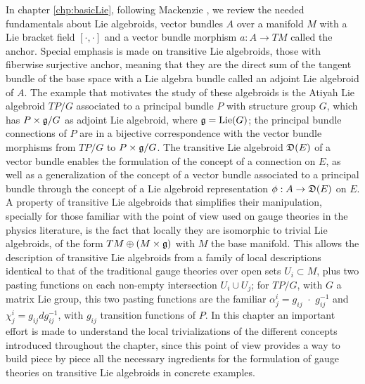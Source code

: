 In chapter \ref{chp:basicLie}, following Mackenzie \cite{Mackenzie2005}, we review the needed fundamentals about Lie algebroids, vector bundles $A$ over a manifold $M$ with a Lie bracket field $[\cdot, \cdot ]$ and a vector bundle morphism $a:A \to TM$ called the anchor. Special emphasis is made on transitive Lie algebroids, those with fiberwise surjective anchor, meaning that they are the direct sum of the tangent bundle of the base space with a Lie algebra bundle called an adjoint Lie algebroid of $A$. The example that motivates the study of these algebroids is the Atiyah Lie algebroid $TP/G$ associated to a principal bundle $P$ with structure group $G$, which has $P \times \mathfrak{g}/G$ as adjoint Lie algebroid, where $\mathfrak{g} = \text{Lie}(G)$; the principal bundle connections of $P$ are in a bijective correspondence with the vector bundle morphisms from $TP/G$ to $P \times \mathfrak{g}/G$. The transitive Lie algebroid $\mathfrak{D}(E)$ of a vector bundle enables the formulation of the concept of a connection on $E$, as well as a generalization of the concept of a vector bundle associated to a principal bundle through the concept of a Lie algebroid representation $\phi: A \to \alg D(E)$ on $E$. A property of transitive Lie algebroids that simplifies their manipulation, specially for those familiar with the point of view used on gauge theories in the physics literature, is the fact that locally they are isomorphic to trivial Lie algebroids, of the form $TM \oplus (M \times \mathfrak{g})$ with $M$ the base manifold. This allows the description of transitive Lie algebroids from a family of local descriptions identical to that of the traditional gauge theories over open sets $U_i \subset M$, plus two pasting functions on each non-empty intersection $U_i \cup U_j$; for $TP/G$, with $G$ a matrix Lie group, this two pasting functions are the familiar $\alpha^i_j = g_{ij} \,\,\cdot \,\, g_{ij}^{-1}$ and $\chi^i_j = g_{ij} dg_{ij}^{-1}$, with $g_{ij}$ transition functions of $P$. In this chapter an important effort is made to understand the local trivializations of the different concepts introduced throughout the chapter, since this point of view provides a way to build piece by piece all the necessary ingredients for the formulation of gauge theories on transitive Lie algebroids in concrete examples.

